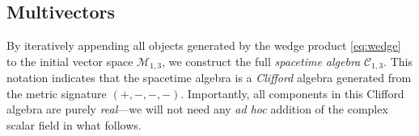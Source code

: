 \documentclass[1p,sort&compress]{elsarticle}
\numberwithin{equation}{section}
\begin{document}

\subsection{Multivectors}\label{sec:multivectors}


By iteratively appending all objects generated by the wedge product \eqref{eq:wedge} to the initial vector space $\mathcal{M}_{1,3}$, we construct the full \emph{spacetime algebra} $\mathcal{C}_{1,3}$.  This notation indicates that the spacetime algebra is a \emph{Clifford} algebra generated from the metric signature $(+,-,-,-)$.  Importantly, all components in this Clifford algebra are purely \emph{real}---we will not need any \emph{ad hoc} addition of the complex scalar field in what follows.
\end{document}
